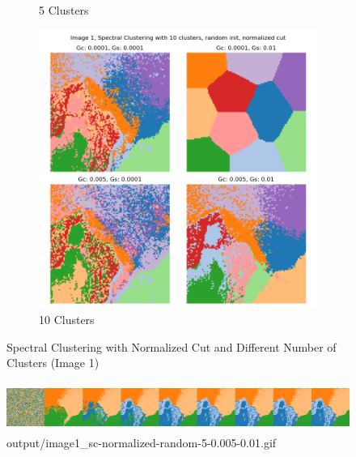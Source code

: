\documentclass{homework}
\begin{document}
\begin{figure}[H]
\begin{subfigure}{0.32\textwidth}
        \caption{5 Clusters}
    \end{subfigure}
    \begin{subfigure}{0.32\textwidth}
        \centering
        \includegraphics[width=\textwidth]{output_grid/image1_sc-normalized-random-10.png}
        \caption{10 Clusters}
    \end{subfigure}
    \caption{Spectral Clustering with Normalized Cut and Different Number of Clusters (Image 1)}
\end{figure}

\begin{figure}[H]
    \centering
    \includegraphics[height=1.6cm]{output_flatgif/flatgif_image1_sc-normalized-random-5-0.005-0.01.png}
    \caption{output/image1\_sc-normalized-random-5-0.005-0.01.gif}
\end{figure}
\end{document}
